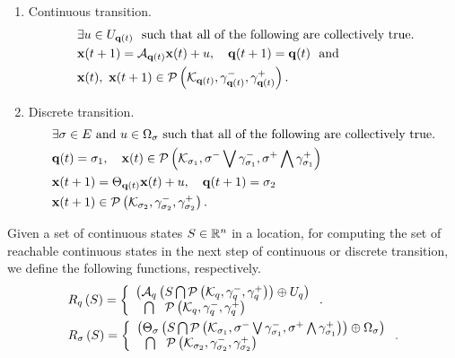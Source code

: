 \begin{enumerate}
\item Continuous transition.
\begin{align}~\label{eqn:intralocation}
\begin{split}
& \exists u\in U_{{\bf q}(t)}~~\text{such that all of
    the following  are collectively true.}\\
& {\bf x}(t+1) = \mathcal{A}_{{\bf q}(t)}{\bf x}(t)+u,~~~{\bf q}(t+1) = {\bf q}(t)~~
\text{and}\\
& {\bf x}(t),~{\bf x}(t+1)\in\mathcal{P}\left(\mathcal{K}_{{\bf q}(t)},\gamma^-_{{\bf q}(t)},\gamma^+_{{\bf q}(t)}\right).
\end{split}
\end{align}
\item Discrete transition.
\begin{align} 
\begin{split}
& \exists \sigma\in E~\text{and}~u\in\Omega_{\sigma}~\text{such
that all of the following are collectively true.}\\
& {\bf q}(t)=\sigma_{1},~~~{\bf x}(t)\in\mathcal{P}\left(\mathcal{K}_{\sigma_{1}},\sigma^-\bigvee\gamma^-_{\sigma_{1}},\sigma^+\bigwedge\gamma^+_{\sigma_{1}}\right) \\
& {\bf x}(t+1) = \Theta_{{\bf q}(t)}{\bf x}(t)+u,~~~{\bf q}(t+1)
= \sigma_{2}\\
& {\bf x}(t+1)\in \mathcal{P}\left(\mathcal{K}_{\sigma_{2}},\gamma^-_{\sigma_{2}},\gamma^+_{\sigma_{2}}\right).
\end{split}
\end{align}
\end{enumerate}


Given a set of continuous states $S\in\mathbb{R}^n$ in a
 location, for computing the set of reachable continuous states in the
 next step of continuous or discrete transition, we define the
 following functions, respectively.
\begin{align*}
&R_{q}\left(S\right) = \left\{\begin{array}{l}{\left(\mathcal{A}_{q}\left(S\bigcap\mathcal{P}\left(\mathcal{K}_{q},\gamma^-_{q},\gamma^+_{q}\right)\right)\oplus
U_q\right)}\\{~~\bigcap~~\mathcal{P}\left(\mathcal{K}_{q},\gamma^-_{q},\gamma^+_{q}\right)} \end{array}\right..\\
&R_{\sigma}\left(S\right) =  \left\{\begin{array}{l}{\left(\Theta_\sigma\left(S\bigcap
\mathcal{P}\left(\mathcal{K}_{\sigma_{1}},\sigma^-\bigvee\gamma^-_{\sigma_{1}},\sigma^+\bigwedge\gamma^+_{\sigma_{1}}\right)\right)\oplus\Omega_\sigma\right)}\\{~~\bigcap~~\mathcal{P}\left(\mathcal{K}_{\sigma_{2}},\gamma^-_{\sigma_{2}},\gamma^+_{\sigma_{2}}\right)} \end{array}\right..
\end{align*}

